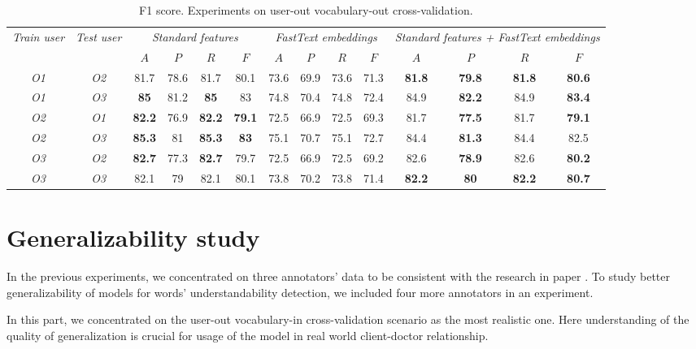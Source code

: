 \begin{table}[h]
\begin{tabular}{cc|cccc|cccc|cccc}
\multirow{2}{0.6cm}{\textit{Train user}} & \multirow{2}{0.6cm}{\textit{Test user}} & \multicolumn{4}{c|}{\textit{Standard features}} & \multicolumn{4}{c|}{\textit{FastText embeddings}} & \multicolumn{4}{X}{\textit{Standard features + FastText embeddings}} \\ \cline{3-14} 
 &  & $A$ & $P$ & $R$ & $F$ & $A$ & $P$ & $R$ & $F$ & $A$ & $P$ & $R$ & $F$ \\ \hline
\textit{O1} & \textit{O2} & 81.7 & 78.6 & 81.7 & 80.1 & 73.6 & 69.9 & 73.6 & 71.3 & \textbf{81.8} & \textbf{79.8} & \textbf{81.8} & \textbf{80.6} \\ 
\textit{O1} & \textit{O3} & \textbf{85} & 81.2 & \textbf{85} & 83 & 74.8 & 70.4 & 74.8 & 72.4 & 84.9 & \textbf{82.2} & 84.9 & \textbf{83.4} \\ \hline 
\textit{O2} & \textit{O1} & \textbf{82.2} & 76.9 & \textbf{82.2} & \textbf{79.1} & 72.5 & 66.9 & 72.5 & 69.3 & 81.7 & \textbf{77.5} & 81.7 & \textbf{79.1} \\
\textit{O2} & \textit{O3} & \textbf{85.3} & 81 & \textbf{85.3} & \textbf{83} & 75.1 & 70.7 & 75.1 & 72.7 & 84.4 & \textbf{81.3} & 84.4 & 82.5 \\ \hline 
\textit{O3} & \textit{O2} & \textbf{82.7} & 77.3 & \textbf{82.7} & 79.7 & 72.5 & 66.9 & 72.5 & 69.2 & 82.6 & \textbf{78.9} & 82.6 & \textbf{80.2} \\ 
\textit{O3} & \textit{O3} & 82.1 & 79 & 82.1 & 80.1 & 73.8 & 70.2 & 73.8 & 71.4 & \textbf{82.2} & \textbf{80} & \textbf{82.2} & \textbf{80.7} \\ \hline 
\end{tabular}
    \caption{F1 score. Experiments on user-out vocabulary-out cross-validation.}
    \label{tab:user-out-voc-out}
\end{table}

\section{Generalizability study}
\label{sec:generalizability-study}
In the previous experiments, we concentrated on three annotators' data to be consistent with the research in paper \citep{Grabar-PITR2014}. To study better generalizability of models for words' understandability detection, we included four more annotators in an experiment.

In this part, we concentrated on the user-out vocabulary-in cross-validation scenario as the most realistic one. Here understanding of the quality of generalization is crucial for usage of the model in real world client-doctor relationship.

